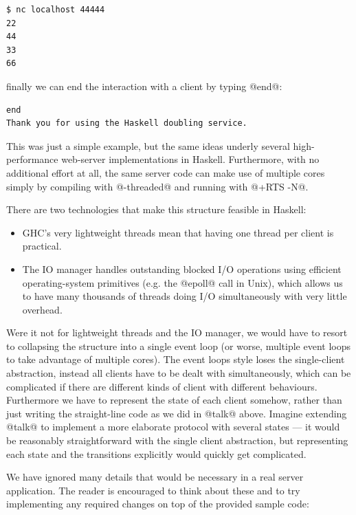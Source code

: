 \begin{verbatim}
$ nc localhost 44444
22
44
33
66
\end{verbatim}

\noindent finally we can end the interaction with a client by typing
@end@:

\begin{verbatim}
end
Thank you for using the Haskell doubling service.
\end{verbatim}

This was just a simple example, but the same ideas underly several
high-performance web-server implementations in Haskell.  Furthermore,
with no additional effort at all, the same server code can make use of
multiple cores simply by compiling with @-threaded@ and running with
@+RTS -N@.

There are two technologies that make this structure feasible in
Haskell:

\begin{itemize}
\item GHC's very lightweight threads mean that having one thread per
  client is practical.
\item The IO manager \cite{io-manager} handles outstanding blocked I/O
  operations using efficient operating-system primitives (e.g. the
  @epoll@ call in Unix), which allows us to have many thousands of
  threads doing I/O simultaneously with very little overhead.
\end{itemize}

Were it not for lightweight threads and the IO manager, we would have
to resort to collapsing the structure into a single event loop (or
worse, multiple event loops to take advantage of multiple cores).  The
event loops style loses the single-client abstraction, instead all
clients have to be dealt with simultaneously, which can be complicated
if there are different kinds of client with different behaviours.
Furthermore we have to represent the state of each client somehow,
rather than just writing the straight-line code as we did in @talk@
above.  Imagine extending @talk@ to implement a more elaborate
protocol with several states --- it would be reasonably
straightforward with the single client abstraction, but representing
each state and the transitions explicitly would quickly get
complicated.

We have ignored many details that would be necessary in a real server
application.  The reader is encouraged to think about these and to try
implementing any required changes on top of the provided sample code:

